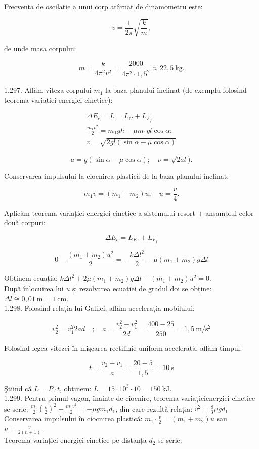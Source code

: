 Frecvența de oscilație a unui corp atârnat de dinamometru este:

$$
v=\frac{1}{2 \pi} \sqrt{\frac{k}{m}},
$$

de unde masa corpului:

$$
m=\frac{k}{4 \pi^{2} v^{2}}=\frac{2000}{4 \pi^{2} \cdot 1,5^{2}} \approx 22,5 \mathrm{~kg} .
$$

1.297. Aflăm viteza corpului $m_{1}$ la baza planului înclinat (de exemplu folosind teorema variației energiei cinetice):


\begin{gather*}
\Delta E_{c}=L=L_{G}+L_{F_{f}} \\
\frac{m_{1} v^{2}}{2}=m_{1} g h-\mu m_{1} g l \cos \alpha ; \\
v=\sqrt{2 g l(\sin \alpha-\mu \cos \alpha)} \tag{(Variantă:}
\end{gather*}


$$
a=g(\sin \alpha-\mu \cos \alpha) ; \quad \nu=\sqrt{2 a l}) .
$$

Conservarea impulsului la ciocnirea plastică de la baza planului înclinat:

$$
m_{1} v=\left(m_{1}+m_{2}\right) u ; \quad u=\frac{v}{4} .
$$

Aplicăm teorema variației energiei cinetice a sistemului resort + ansamblul celor două corpuri:

$$
\Delta E_{c}=L_{F e}+L_{F_{f}}
$$

$$
0-\frac{\left(m_{1}+m_{2}\right) u^{2}}{2}=-\frac{k \Delta l^{2}}{2}-\mu\left(m_{1}+m_{2}\right) g \Delta l
$$

Obținem ecuația: $k \Delta l^{2}+2 \mu\left(m_{1}+m_{2}\right) g \Delta l-\left(m_{1}+m_{2}\right) u^{2}=0$.\\
După înlocuirea lui $u$ și rezolvarea ecuației de gradul doi se obține: $\Delta l \cong 0,01 \mathrm{~m}=1 \mathrm{~cm}$.\\
1.298. Folosind relația lui Galilei, aflăm accelerația mobilului:

$$
v_{2}^{2}=v_{1}^{2} 2 a d \quad ; \quad a=\frac{v_{2}^{2}-v_{1}^{2}}{2 d}=\frac{400-25}{250}=1,5 \mathrm{~m} / \mathrm{s}^{2}
$$

Folosind legea vitezei în mişcarea rectilinie uniform accelerată, aflăm timpul:

$$
t=\frac{v_{2}-v_{1}}{a}=\frac{20-5}{1,5}=10 \mathrm{~s}
$$

Ştiind că $L=P \cdot t$, obținem: $L=15 \cdot 10^{3} \cdot 10=150 \mathrm{~kJ}$.\\
1.299. Pentru primul vagon, înainte de ciocnire, teorema variațieienergiei cinetice se scrie: $\frac{m_{1}}{2}\left(\frac{v}{2}\right)^{2}-\frac{m_{1} v^{2}}{2}=-\mu g m_{1} d_{1}$, din care rezultă relația: $v^{2}=\frac{8}{3} \mu g d_{1}$\\
Conservarea impulsului în ciocnirea plastică: $m_{1} \cdot \frac{v}{2}=\left(m_{1}+m_{2}\right) u$ sau $u=\frac{v}{2(n+1)}$.\\
Teorema variației energiei cinetice pe distanța $d_{2}$ se scrie:


